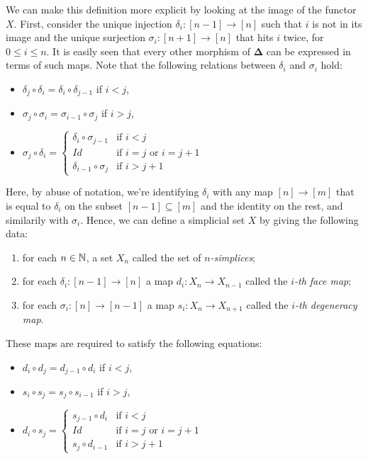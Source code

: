 \documentclass[TFM.tex]{subfiles}
\begin{document}
We can make this definition more explicit by looking at the image of the functor $X$. First, consider the unique injection $\delta_i:[n-1]\to[n]$ such that $i$ is not in its image and the unique surjection $\sigma_i:[n+1]\to [n]$ that hits $i$ twice, for $0\leq i\leq n$. It is easily seen that every other morphism of $\mathbf{\Delta}$ can be expressed in terms of such maps. Note that the following relations between $\delta_i$ and $\sigma_i$ hold:
\begin{itemize}
\item $\delta_j\circ\delta_i=\delta_i\circ \delta_{j-1}$ if $i<j$,
\item $\sigma_j\circ \sigma_i=\sigma_{i-1}\circ \sigma_j$ if $i>j$,
\item $\sigma_j\circ\delta_i=\begin{cases}
\delta_i\circ \sigma_{j-1} &\text{if } i<j\\
Id & \text{if } i=j\text{ or }i=j+1\\
\delta_{i-1}\circ \sigma_j & \text{if }i>j+1
\end{cases}$
\end{itemize}
Here, by abuse of notation, we're identifying $\delta_i$ with any map $[n]\to[m]$ that is equal to $\delta_i$ on the subset $[n-1]\subseteq [m]$ and the identity on the rest, and similarily with $\sigma_i$. Hence, we can define a simplicial set $X$ by giving the following data:
\begin{enumerate}
\item for each $n\in\mathbb{N}$, a set $X_n$ called the set of \emph{$n$-simplices};
\item for each $\delta_i:[n-1]\to[n]$ a map $d_i:X_n\to X_{n-1}$ called the \emph{$i$-th face map};
\item for each $\sigma_i:[n]\to[n-1]$ a map $s_i:X_n\to X_{n+1}$ called the \emph{$i$-th degeneracy map}.
\end{enumerate} 
These maps are required to satisfy the following equations:
\begin{itemize}
\item $d_i \circ d_j  = d_{j-1} \circ d_i$ if $i<j$,
\item $s_i \circ s_j  = s_j \circ s_{i-1}$ if $i>j$,
\item $d_i \circ s_j =  \begin{cases} s_{j-1} \circ d_i &  \text{if }  i < j \\ Id & \text{if }  i = j \text{ or } i = j+1 \\ s_j \circ d_{i-1} &  \text{if }i > j+1  \end{cases}$
\end{itemize}
\end{document}
